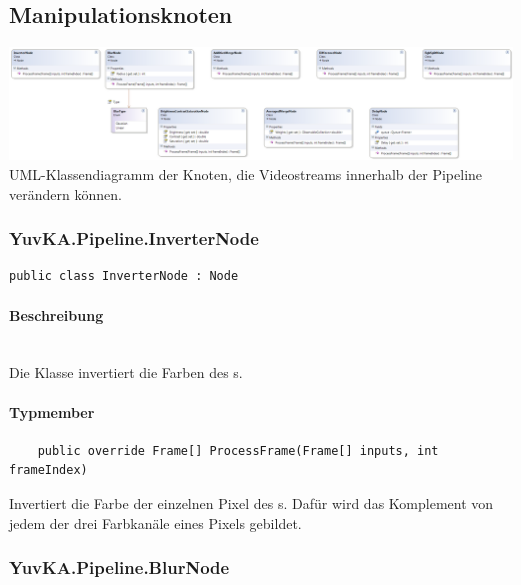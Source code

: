 \renewcommand{\algorithmicrequire}{\textbf{Eingabe:}} 
\renewcommand{\algorithmicensure}{\textbf{Ausgabe:}} 

\subsection{Manipulationsknoten}

\includegraphics[width=\textwidth]{YuvKA.Pipeline/manipulationnodes.png}
UML-Klassendiagramm der Knoten, die Videostreams innerhalb der Pipeline verändern können.

\subsubsection{YuvKA.Pipeline.InverterNode}
\begin{verbatim}
public class InverterNode : Node
\end{verbatim}

\paragraph{Beschreibung}~\\
Die Klasse  invertiert die Farben des s.

\paragraph{Typmember}
\begin{itemize}

	\begin{verbatim}
	public override Frame[] ProcessFrame(Frame[] inputs, int frameIndex)
	\end{verbatim}
	Invertiert die Farbe der einzelnen Pixel des s. Dafür wird das Komplement von jedem der drei Farbkanäle eines Pixels gebildet.

\end{itemize}


\subsubsection{YuvKA.Pipeline.BlurNode}

